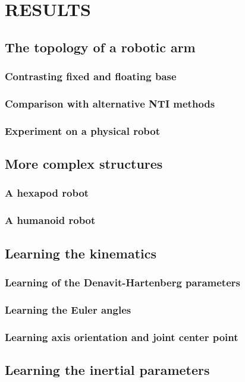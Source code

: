 \documentclass{article}
\begin{document}
\section{RESULTS}
\subsection{The topology of a robotic arm}
\subsubsection{Contrasting fixed and floating base}
\subsubsection{Comparison with alternative NTI methods}
\subsubsection{Experiment on a physical robot}
\subsection{More complex structures}
\subsubsection{A hexapod robot}
\subsubsection{A humanoid robot}
\subsection{Learning the kinematics}
\subsubsection{Learning of the Denavit-Hartenberg parameters}
\subsubsection{Learning the Euler angles}
\subsubsection{Learning axis orientation and joint center point }
\subsection{Learning the inertial parameters}
\end{document}
